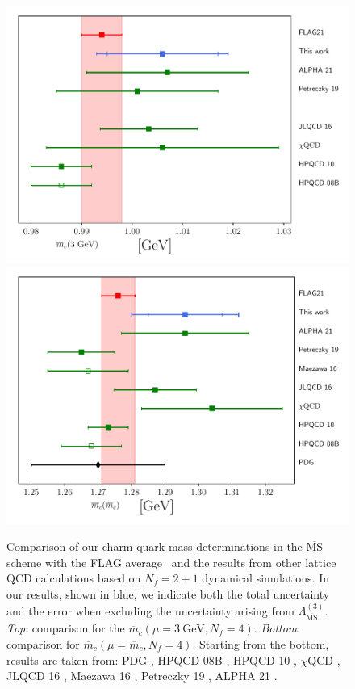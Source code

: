 \begin{figure}
	\centering
	\hspace{-0mm}
	\includegraphics[scale=0.6]{./cap6/figs/mc/mc_comparison_3gev.pdf}
	\includegraphics[scale=0.6]{./cap6/figs/mc/mc_comparison.pdf}
	\caption{Comparison of our charm quark mass determinations in the $\overline{\textrm{MS}}$ scheme with the FLAG average~\cite{FlavourLatticeAveragingGroupFLAG:2021npn} and the results from other lattice QCD calculations based on $N_f=2+1$ dynamical simulations. In our results, shown in blue, we indicate both the total uncertainty and the error when excluding the uncertainty arising from $\Lambda^{(3)}_{\overline{\mathrm{MS}}}$. \textit{Top}: comparison for the  $\overline{m}_c(\mu=3\ \mathrm{GeV}, N_f=4)$. \textit{Bottom}: comparison for $\overline{m}_c(\mu=\overline{m}_c, N_f=4)$.  Starting from the bottom, results are taken from: PDG \cite{ParticleDataGroup:2022pth}, HPQCD 08B \cite{HPQCD:2008kxl}, HPQCD 10 \cite{McNeile:2010ji}, $\chi$QCD \cite{Yang:2014sea}, JLQCD 16 \cite{Nakayama:2016atf}, Maezawa 16 \cite{Maezawa:2016vgv}, Petreczky 19 \cite{Petreczky:2019ozv}, ALPHA 21 \cite{Heitger:2021apz}.
       }
	\label{fig:mc_comparison}
\end{figure}

